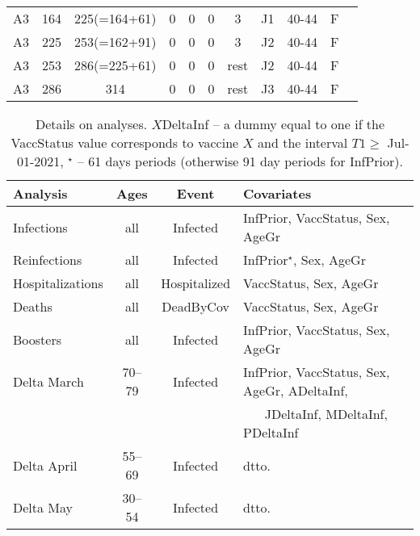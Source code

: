 \documentclass[preprint,12pt,authoryear]{elsarticle}
\begin{document}
\begin{table}
\begin{tabular}{cccccccclcc}
A3 & 164 & 225(=164+61) & 0 & 0& 0 & 3 & J1 & 40-44 & F\\
A3 & 225 & 253(=162+91) & 0 & 0& 0 & 3 & J2 & 40-44 & F\\
A3 & 253 & 286(=225+61) & 0 & 0& 0 & rest & J2 & 40-44 & F\\
A3 & 286 & 314  & 0 & 0& 0 & rest & J3 & 40-44 & F\\
\hline
\end{tabular}
\end{table}

\begin{table}
\caption{Details on analyses. $X$DeltaInf -- a dummy equal to one if the VaccStatus value corresponds to vaccine $X$ and the interval $T1 \geq$ Jul-01-2021, $^\star$ -- 61 days periods (otherwise 91 day periods for InfPrior). \vspace{1mm}}
\centering
\begin{tabular}{lccl}
\hline
Analysis & Ages & Event & Covariates \\ \hline
Infections  & all & Infected & 
InfPrior, VaccStatus, Sex, AgeGr \\
Reinfections & all & Infected & InfPrior$^\star$, Sex, AgeGr \\
Hospitalizations & all & Hospitalized & VaccStatus, Sex, AgeGr \\
Deaths & all & DeadByCov & VaccStatus, Sex, AgeGr \\
Boosters & all & Infected &
InfPrior, VaccStatus, Sex, AgeGr \\
Delta March& 70--79 & Infected & InfPrior, VaccStatus, Sex, AgeGr, ADeltaInf,\\
& & & 
\,\,\,\,\,\,\,\, JDeltaInf, MDeltaInf, PDeltaInf \\
Delta April& 55--69 & Infected & dtto. \\
Delta May& 30--54 & Infected & dtto. \\
\hline
\end{tabular}
\end{table}
\end{document}
